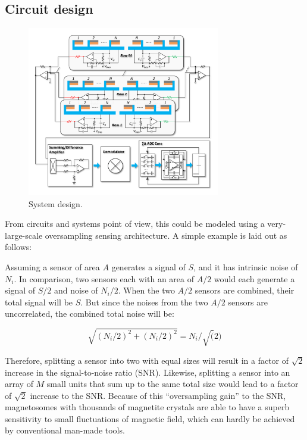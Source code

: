 \subsection{Circuit design}
 
\begin{figure}
\centering
\includegraphics[width=0.75\textwidth]{System}
\caption{System design.}
\label{fig:system}
\end{figure}

From circuits and systems point of view, this could be modeled using a very-large-scale oversampling sensing architecture. A simple example is laid out as follows: 

Assuming a sensor of area $A$ generates a signal of $S$, and it has intrinsic noise of $N_i$. In comparison, two sensors each with an area of $A/2$ would each generate a signal of $S/2$ and noise of $N_i/2$. When the two $A/2$ sensors are combined, their total signal will be $S$. But since the noises from the two $A/2$ sensors are uncorrelated, the combined total noise will be:

$$\sqrt{(N_i/2)^2+(N_i/2)^2} = N_i/\sqrt(2) $$

Therefore, splitting a sensor into two with equal sizes will result in a factor of $\sqrt{2}$ increase in the signal-to-noise ratio (SNR). Likewise, splitting a sensor into an array of $M$ small units that sum up to the same total size would lead to a factor of $\sqrt{2}$ increase to the SNR. Because of this “oversampling gain” to the SNR, magnetosomes with thousands of magnetite crystals are able to have a superb sensitivity to small fluctuations of magnetic field, which can hardly be achieved by conventional man-made tools. 

